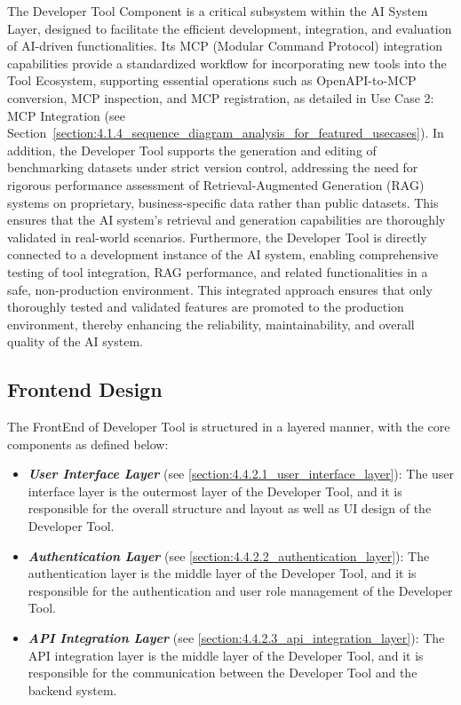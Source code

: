 \documentclass[../Main.tex]{subfiles}
\begin{document}
{{	The Developer Tool Component is a critical subsystem within the AI System Layer, designed to facilitate the efficient development, integration, and evaluation of AI-driven functionalities. Its MCP (Modular Command Protocol) integration capabilities provide a standardized workflow for incorporating new tools into the Tool Ecosystem, supporting essential operations such as OpenAPI-to-MCP conversion, MCP inspection, and MCP registration, as detailed in Use Case 2: MCP Integration (see Section~\ref{section:4.1.4_sequence_diagram_analysis_for_featured_usecases}). In addition, the Developer Tool supports the generation and editing of benchmarking datasets under strict version control, addressing the need for rigorous performance assessment of Retrieval-Augmented Generation (RAG) systems on proprietary, business-specific data rather than public datasets. This ensures that the AI system's retrieval and generation capabilities are thoroughly validated in real-world scenarios. Furthermore, the Developer Tool is directly connected to a development instance of the AI system, enabling comprehensive testing of tool integration, RAG performance, and related functionalities in a safe, non-production environment. This integrated approach ensures that only thoroughly tested and validated features are promoted to the production environment, thereby enhancing the reliability, maintainability, and overall quality of the AI system.

	\subsection{Frontend Design}
	\label{section:4.4.2_frontend_design}
	The FrontEnd of Developer Tool is structured in a layered manner, with the core components as defined below:
	\begin{itemize}
		\item \emph{\textbf{User Interface Layer}} (see \ref{section:4.4.2.1_user_interface_layer}): The user interface layer is the outermost layer of the Developer Tool, and it is responsible for the overall structure and layout as well as UI design of the Developer Tool.
		\item \emph{\textbf{Authentication Layer}} (see \ref{section:4.4.2.2_authentication_layer}): The authentication layer is the middle layer of the Developer Tool, and it is responsible for the authentication and user role management of the Developer Tool.
		\item \emph{\textbf{API Integration Layer}} (see \ref{section:4.4.2.3_api_integration_layer}): The API integration layer is the middle layer of the Developer Tool, and it is responsible for the communication between the Developer Tool and the backend system.
	\end{itemize}

}}
\end{document}
